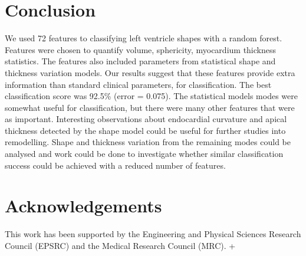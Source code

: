 \documentclass{llncs}
\begin{document}
\section{Conclusion}
We used 72 features to classifying left ventricle shapes with a random forest. Features were chosen to quantify volume, sphericity, myocardium thickness statistics. The features also included parameters from statistical shape and thickness variation models. Our results suggest that these features provide extra information than standard clinical parameters, for classification. The best classification score was 92.5\% (error = 0.075). 
The statistical models modes were somewhat useful for classification, but there were many other features that were as important. Interesting observations about endocardial curvature and apical thickness detected by the shape model could be useful for further studies into remodelling. Shape and thickness variation from the remaining modes could be analysed and work could be done to investigate whether similar classification success could be achieved with a reduced number of features.
\section{Acknowledgements}
This work has been supported by the Engineering and Physical Sciences Research Council (EPSRC) and the Medical Research Council (MRC).
+


\end{document}
